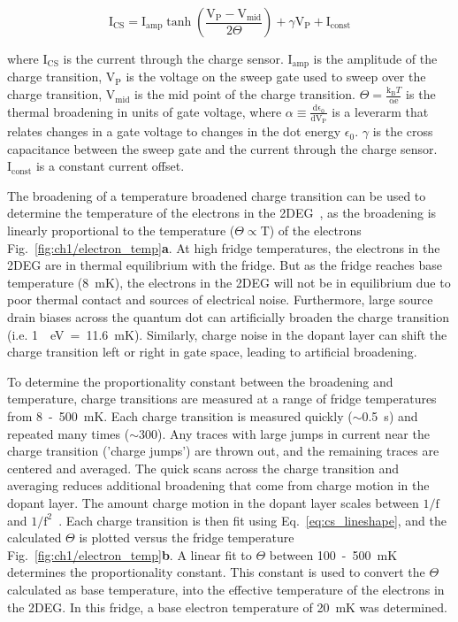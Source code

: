 \begin{equation}\label{eq:cs_lineshape}
  \mathrm{I_{CS}} = 
  \mathrm{I_{amp}}
  \tanh
  \left( 
  \frac{\mathrm{V_P - V_{mid}}}{2\Theta}
  \right) + 
  \gamma \mathrm{V_P}
  + \mathrm{I_{const}}
\end{equation}

where $\mathrm{I_{CS}}$ is the current through the charge sensor. $\mathrm{I_{amp}}$ is the amplitude of the charge transition, $\mathrm{V_{P}}$ is the voltage on the sweep gate used to sweep over the charge transition, $\mathrm{V_{mid}}$ is the mid point of the charge transition. $\Theta=\frac{\mathrm{k_B}T}{\mathrm{\alpha e}}$ is the thermal broadening in units of gate voltage, where $\alpha \equiv \frac{\mathrm{d\epsilon_0}}{\mathrm{dV_P}}$ is a leverarm that relates changes in a gate voltage to changes in the dot energy $\epsilon_0$. $\gamma$ is the cross capacitance between the sweep gate and the current through the charge sensor. $\mathrm{I_{const}}$ is a constant current offset.



The broadening of a temperature broadened charge transition can be used to determine the temperature of the electrons in the 2DEG~\cite{cs_measure_temp}, as the broadening is linearly proportional to the temperature ($\Theta\propto\mathrm{T}$) of the electrons Fig.~\ref{fig:ch1/electron_temp}\textbf{a}. At high fridge temperatures, the electrons in the 2DEG are in thermal equilibrium with the fridge. But as the fridge reaches base temperature (\qty{8}{mK}), the electrons in the 2DEG will not be in equilibrium due to poor thermal contact and sources of electrical noise. Furthermore, large source drain biases across the quantum dot can artificially broaden the charge transition (i.e. \qty{1}{\mu eV}~=~\qty{11.6}{mK}). Similarly, charge noise in the dopant layer can shift the charge transition left or right in gate space, leading to artificial broadening. 


To determine the proportionality constant between the broadening and temperature, charge transitions are measured at a range of fridge temperatures from \qty{8}{}~-~\qty{500}{mK}. Each charge transition is measured quickly ($\sim$\qty{0.5}{s}) and repeated many times ($\sim300$). Any traces with large jumps in current near the charge transition ('charge jumps') are thrown out, and the remaining traces are centered and averaged. The quick scans across the charge transition and averaging reduces additional broadening that come from charge motion in the dopant layer. The amount charge motion in the dopant layer scales between $\mathrm{1/f}$ and $\mathrm{1/f^2}$~\cite{charge_noise}. Each charge transition is then fit using Eq.~\ref{eq:cs_lineshape}, and the calculated $\Theta$ is plotted versus the fridge temperature Fig.~\ref{fig:ch1/electron_temp}\textbf{b}. A linear fit to $\Theta$ between \qty{100}{}~-~\qty{500}{mK} determines the proportionality constant. This constant is used to convert the $\Theta$ calculated as base temperature, into the effective temperature of the electrons in the 2DEG. In this fridge, a base electron temperature of \qty{20}{mK} was determined.



